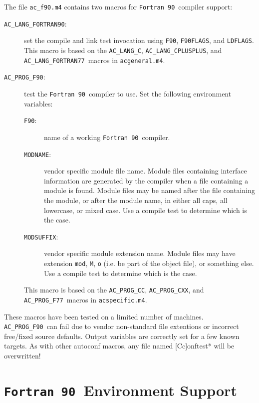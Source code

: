 \documentclass[11pt]{nmemo}
\newcommand{\fninety}{\texttt{Fortran~90}}
\newcommand{\langfninety}{\texttt{AC\_LANG\_FORTRAN90}}
\newcommand{\progfninety}{\texttt{AC\_PROG\_F90}}
\newcommand{\langc}{\texttt{AC\_LANG\_C}}
\newcommand{\langcplusplus}{\texttt{AC\_LANG\_CPLUSPLUS}}
\newcommand{\langfseventyseven}{\texttt{AC\_LANG\_FORTRAN77}}
\newcommand{\progcc}{\texttt{AC\_PROG\_CC}}
\newcommand{\progcxx}{\texttt{AC\_PROG\_CXX}}
\newcommand{\progfseventyseven}{\texttt{AC\_PROG\_F77}}
\begin{document}
The file \texttt{ac\_f90.m4} contains two macros for \fninety\
compiler support:
\begin{description}
\item[\langfninety:] set the compile and link test invocation using
\texttt{F90}, \texttt{F90FLAGS}, and \texttt{LDFLAGS}.  This macro is
based on the \langc, \langcplusplus, and \langfseventyseven\ macros in
\texttt{acgeneral.m4}.
\item[\progfninety:] test the \fninety\ compiler to use.  Set the
following environment variables:
\begin{description}
\item[\texttt{F90}:] name of a working \fninety\ compiler.
\item[\texttt{MODNAME}:] vendor specific module file name.  Module
files containing interface information are generated by the compiler
when a file containing a module is found.  Module files may be named
after the file containing the module, or after the module name, in
either all caps, all lowercase, or mixed case.  Use a compile test to
determine which is the case.   
\item[\texttt{MODSUFFIX}:] vendor specific module extension name.
Module files may have extension \texttt{mod}, \texttt{M}, \texttt{o}
(i.e. be part of the object file), or something else.  Use a compile
test to determine which is the case.
\end{description}
This macro is based on the \progcc, \progcxx, and \progfseventyseven\
macros in \texttt{acspecific.m4}.
\end{description}

These macros have been tested on a limited number of machines.
\progfninety\ can fail due to vendor non-standard file extentions or
incorrect free/fixed source defaults.  Output variables are correctly
set for a few known targets.  As with other autoconf macros, any
file named [Cc]onftest* will be overwritten!

\section{\fninety\ Environment Support}
\end{document}

